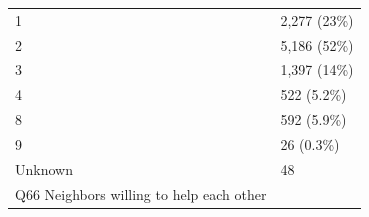 \documentclass[]{article}
\begin{document}
\begin{longtable}[]{@{}ll@{}}
\begin{minipage}[t]{0.71\columnwidth}
1\strut
\end{minipage} & \begin{minipage}[t]{0.23\columnwidth}\raggedright
2,277 (23\%)\strut
\end{minipage}\tabularnewline
\begin{minipage}[t]{0.71\columnwidth}\raggedright
2\strut
\end{minipage} & \begin{minipage}[t]{0.23\columnwidth}\raggedright
5,186 (52\%)\strut
\end{minipage}\tabularnewline
\begin{minipage}[t]{0.71\columnwidth}\raggedright
3\strut
\end{minipage} & \begin{minipage}[t]{0.23\columnwidth}\raggedright
1,397 (14\%)\strut
\end{minipage}\tabularnewline
\begin{minipage}[t]{0.71\columnwidth}\raggedright
4\strut
\end{minipage} & \begin{minipage}[t]{0.23\columnwidth}\raggedright
522 (5.2\%)\strut
\end{minipage}\tabularnewline
\begin{minipage}[t]{0.71\columnwidth}\raggedright
8\strut
\end{minipage} & \begin{minipage}[t]{0.23\columnwidth}\raggedright
592 (5.9\%)\strut
\end{minipage}\tabularnewline
\begin{minipage}[t]{0.71\columnwidth}\raggedright
9\strut
\end{minipage} & \begin{minipage}[t]{0.23\columnwidth}\raggedright
26 (0.3\%)\strut
\end{minipage}\tabularnewline
\begin{minipage}[t]{0.71\columnwidth}\raggedright
Unknown\strut
\end{minipage} & \begin{minipage}[t]{0.23\columnwidth}\raggedright
48\strut
\end{minipage}\tabularnewline
\begin{minipage}[t]{0.71\columnwidth}\raggedright
Q66 Neighbors willing to help each other\strut
\end{minipage} & \begin{minipage}[t]{0.23\columnwidth}\raggedright
\strut
\end{minipage}\tabularnewline

\end{longtable}
\end{document}

